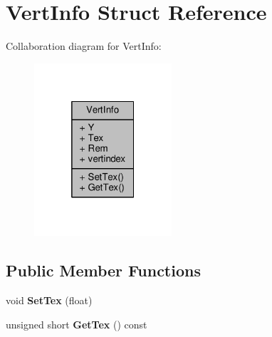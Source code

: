 \hypertarget{structVertInfo}{}\section{Vert\+Info Struct Reference}
\label{structVertInfo}


Collaboration diagram for Vert\+Info\+:
\nopagebreak
\begin{figure}[H]
\begin{center}
\leavevmode
\includegraphics[width=145pt]{da/d2b/structVertInfo__coll__graph}
\end{center}
\end{figure}
\subsection*{Public Member Functions}
\begin{DoxyCompactItemize}
\item 
void {\bfseries Set\+Tex} (float)\hypertarget{structVertInfo_abc9dcbe3b59c0c1a90f8804d54b9c636}{}\label{structVertInfo_abc9dcbe3b59c0c1a90f8804d54b9c636}

\item 
unsigned short {\bfseries Get\+Tex} () const \hypertarget{structVertInfo_a5ba4d95343a6c580b4bd9ac517f642bf}{}\label{structVertInfo_a5ba4d95343a6c580b4bd9ac517f642bf}

\end{DoxyCompactItemize}
